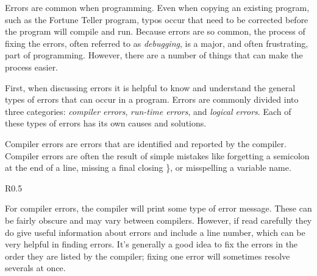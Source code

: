 

Errors are common when programming.  Even when copying an existing program, such as the Fortune Teller program, typos occur that need to be corrected before the program will compile and run.  Because errors are so common, the process of fixing the errors, often referred to as \emph{debugging}, is a major, and often frustrating, part of programming.  However, there are a number of things that can make the process easier.

First, when discussing errors it is helpful to know and understand the general types of errors that can occur in a program.  Errors are commonly divided into three categories: \emph{compiler errors}, \emph{run-time errors}, and \emph{logical errors}.  Each of these types of errors has its own causes and solutions.


Compiler errors are errors that are identified and reported by the compiler.   Compiler errors are often the result of simple mistakes like forgetting a semicolon at the end of a line, missing a final closing \}, or misspelling a variable name.  

\begin{wrapfigure}{R}{0.5\textwidth} 
\vspace{-0.5cm}
\end{wrapfigure}

For compiler errors, the compiler will print some type of error message.   These can be fairly obscure and may vary between compilers.  However, if read carefully they do give useful information about errors and include a line number, which can be very helpful in finding errors.  It's generally a good idea to fix the errors in the order they are listed by the compiler; fixing one error will sometimes resolve severals at once.

